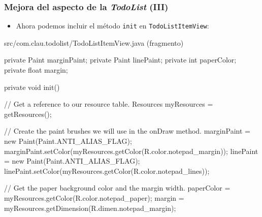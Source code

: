\documentclass[hyperref={pdfpagelabels=true},ucs]{beamer}
\begin{document}
\begin{frame}[fragile]
\frametitle{Mejora del aspecto de la \emph{TodoList} (III)}

\begin{itemize}
\item Ahora podemos incluir el método \verb|init| en
  \verb|TodoListItemView|:
\end{itemize}

\begin{tiny}
\begin{block}{src/com.clau.todolist/TodoListItemView.java (fragmento)}
\begin{java}
private Paint marginPaint;
private Paint linePaint;
private int paperColor;
private float margin;

private void init() {
  // Get a reference to our resource table.
  Resources myResources = getResources();

  // Create the paint brushes we will use in the onDraw method.
  marginPaint = new Paint(Paint.ANTI_ALIAS_FLAG);
  marginPaint.setColor(myResources.getColor(R.color.notepad_margin));
  linePaint = new Paint(Paint.ANTI_ALIAS_FLAG);
  linePaint.setColor(myResources.getColor(R.color.notepad_lines));

  // Get the paper background color and the margin width.
  paperColor = myResources.getColor(R.color.notepad_paper);
  margin = myResources.getDimension(R.dimen.notepad_margin);
}
\end{java}
\end{block}
\end{tiny}


\end{frame}
\end{document}
